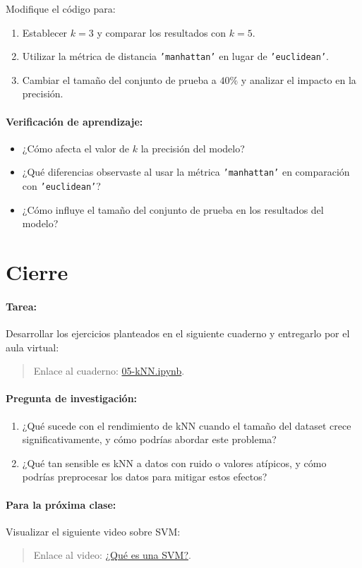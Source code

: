 \documentclass[a4,11pt]{aleph-notas}
\begin{document}
\begin{ejer}
Modifique el código para:
\begin{enumerate}[leftmargin=*]
    \item Establecer \(k = 3\) y comparar los resultados con \(k = 5\).
    \item Utilizar la métrica de distancia \texttt{'manhattan'} en lugar de \texttt{'euclidean'}.
    \item Cambiar el tamaño del conjunto de prueba a \(40\%\) y analizar el impacto en la precisión.
\end{enumerate}
\end{ejer}

\paragraph{Verificación de aprendizaje:}  
\begin{itemize}[leftmargin=*]
    \item ¿Cómo afecta el valor de \(k\) la precisión del modelo?
    \item ¿Qué diferencias observaste al usar la métrica \texttt{'manhattan'} en comparación con \texttt{'euclidean'}?
    \item ¿Cómo influye el tamaño del conjunto de prueba en los resultados del modelo?
\end{itemize}

\section*{Cierre}

\paragraph{Tarea:}
    Desarrollar los ejercicios planteados en el siguiente cuaderno y entregarlo por el aula virtual:
    \begin{quote}
        Enlace al cuaderno: \href{https://colab.research.google.com/github/andres-merino/AprendizajeAutomaticoInicial-05-N0105/blob/main/2-Ejercicios/05-kNN.ipynb}{05-kNN.ipynb}.
    \end{quote}

\paragraph{Pregunta de investigación:}  
\begin{enumerate}[leftmargin=*]
    \item ¿Qué sucede con el rendimiento de kNN cuando el tamaño del dataset crece significativamente, y cómo podrías abordar este problema?
    \item ¿Qué tan sensible es kNN a datos con ruido o valores atípicos, y cómo podrías preprocesar los datos para mitigar estos efectos?
\end{enumerate}

\paragraph{Para la próxima clase:}  
Visualizar el siguiente video sobre SVM:
    \begin{quote}
        Enlace al video: \href{https://www.youtube.com/watch?v=jo9slrXKKNo}{¿Qué es una SVM?}.
    \end{quote}
\end{document}
